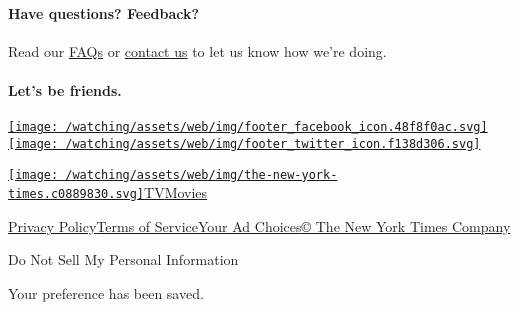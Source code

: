 \hypertarget{have-questions-feedback}{%
\paragraph{Have questions? Feedback?}\label{have-questions-feedback}}

Read our
\href{//www.nytimes3xbfgragh.onion/2017/01/10/watching/faq.html}{FAQs}
or \href{mailto:watchingcare@NYTimes.com}{contact us} to let us know how
we're doing.

\hypertarget{lets-be-friends}{%
\paragraph{Let's be friends.}\label{lets-be-friends}}

\href{https://www.facebookcorewwwi.onion/nytwatching/}{\texttt{[image: /watching/assets/web/img/footer\_facebook\_icon.48f8f0ac.svg]}}\href{https://twitter.com/watching}{\texttt{[image: /watching/assets/web/img/footer\_twitter\_icon.f138d306.svg]}}

\href{//www.nytimes3xbfgragh.onion}{\texttt{[image: /watching/assets/web/img/the-new-york-times.c0889830.svg]}}\href{//www.nytimes3xbfgragh.onion/section/arts/television}{TV}\href{//www.nytimes3xbfgragh.onion/section/movies}{Movies}

\href{//www.nytimes3xbfgragh.onion/content/help/rights/privacy/policy/privacy-policy.html}{Privacy
Policy}\href{//www.nytimes3xbfgragh.onion/content/help/rights/terms/terms-of-service.html}{Terms
of
Service}\href{//www.nytimes3xbfgragh.onion/content/help/rights/privacy/policy/privacy-policy.html\#pp}{Your
Ad Choices}\href{http://www.nytco.com/}{© The New York Times Company}

Do Not Sell My Personal Information

Your preference has been saved.
